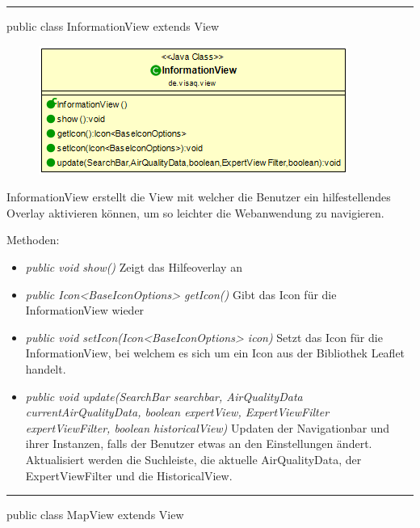 \rule{\textwidth}{0.4pt}
public class InformationView extends View
\begin{minipage}{0.4\textwidth}
    \begin{figure}[H]
        \includegraphics[scale = 0.5]{media/frontend/view/de.view/InformationView_Class.png}
    \end{figure}
\end{minipage} \hfill
\begin{minipage}{0.4\textwidth}
    InformationView erstellt die View mit welcher die Benutzer ein hilfestellendes Overlay aktivieren können, um so leichter
    die Webanwendung zu navigieren.
\end{minipage}

Methoden:
\begin{itemize}
    \item \emph{public void show()} Zeigt das Hilfeoverlay an
    \item \emph{public Icon<BaseIconOptions> getIcon()} Gibt das Icon für die InformationView wieder
    \item \emph{public void setIcon(Icon<BaseIconOptions> icon)} Setzt das Icon für die InformationView, bei welchem es sich um ein Icon aus der Bibliothek \gls{Leaflet} handelt.
    \item \emph{public void update(SearchBar searchbar, AirQualityData currentAirQualityData, boolean expertView, ExpertViewFilter expertViewFilter, boolean historicalView)} Updaten der Navigationbar und ihrer Instanzen, falls der Benutzer etwas an den Einstellungen ändert. Aktualisiert werden die Suchleiste, die aktuelle AirQualityData, der ExpertViewFilter und die HistoricalView.
\end{itemize}

\rule{\textwidth}{0.4pt}
public class MapView extends View

